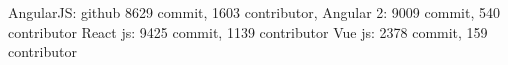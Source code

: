 
AngularJS: github 8629 commit, 1603 contributor, 
Angular 2: 9009 commit, 540 contributor
React js: 9425 commit, 1139 contributor
Vue js: 2378 commit, 159 contributor

